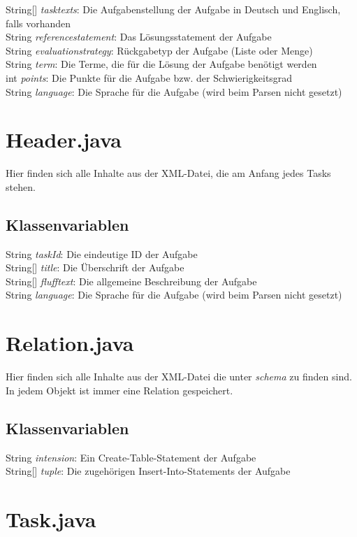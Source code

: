 \documentclass[11pt]{report}
\begin{document}
String[] \textit{tasktexts}: Die Aufgabenstellung der Aufgabe in Deutsch und Englisch, falls vorhanden \\
String \textit{referencestatement}: Das Lösungsstatement der Aufgabe \\
String \textit{evaluationstrategy}: Rückgabetyp der Aufgabe (Liste oder Menge) \\
String \textit{term}: Die Terme, die für die Lösung der Aufgabe benötigt werden \\
int \textit{points}: Die Punkte für die Aufgabe bzw. der Schwierigkeitsgrad \\
String \textit{language}: Die Sprache für die Aufgabe (wird beim Parsen nicht gesetzt)

\section{Header.java}

Hier finden sich alle Inhalte aus der XML-Datei, die am Anfang jedes Tasks stehen.

\subsection*{Klassenvariablen}

String \textit{taskId}: Die eindeutige ID der Aufgabe \\
String[] \textit{title}: Die Überschrift der Aufgabe \\
String[] \textit{flufftext}: Die allgemeine Beschreibung der Aufgabe \\
String \textit{language}: Die Sprache für die Aufgabe (wird beim Parsen nicht gesetzt)

\section{Relation.java}

Hier finden sich alle Inhalte aus der XML-Datei die unter \textit{schema} zu finden sind. In jedem Objekt ist immer eine Relation gespeichert.

\subsection*{Klassenvariablen}
String \textit{intension}: Ein Create-Table-Statement der Aufgabe \\
String[] \textit{tuple}: Die zugehörigen Insert-Into-Statements der Aufgabe

\section{Task.java}
\end{document}
